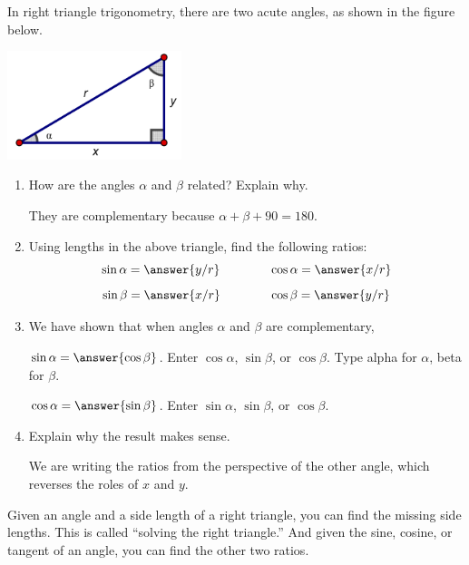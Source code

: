 \documentclass[nooutcomes]{ximera}
\begin{document}
\begin{problem}
In right triangle trigonometry, there are two acute angles, as shown in the figure below.
\begin{image}
\includegraphics[width=2in]{rightTriangle2.png}
\end{image}
\begin{enumerate}
\item How are the angles $\alpha$ and $\beta$ related?  Explain why.  \begin{hint}They are complementary because $\alpha+\beta+90=180$.\end{hint}
\item Using lengths in the above triangle, find the following ratios:    
\[
\sin\alpha = \answer{y/r} \qquad\qquad \cos\alpha = \answer{x/r}
\]
\[
\sin\beta = \answer{x/r} \qquad\qquad \cos\beta = \answer{y/r}
\]
\item We have shown that when angles $\alpha$ and $\beta$ are complementary, 

$\sin\alpha=\answer{\cos\beta}$.  \qquad Enter $\cos\alpha$, $\sin\beta$, or $\cos\beta$.  Type alpha for $\alpha$, beta for $\beta$.  

$\cos\alpha =\answer{\sin\beta}$.  \qquad Enter $\sin\alpha$, $\sin\beta$, or $\cos\beta$.  

\item Explain why the result makes sense.  \begin{hint}We are writing the ratios from the perspective of the other angle, which reverses 
the roles of $x$ and $y$.\end{hint}
\end{enumerate}
\end{problem}

Given an angle and a side length of a right triangle, you can find the missing side lengths.  This is called ``solving the right triangle.''    
And given the sine, cosine, or tangent of an angle, you can find the other two ratios. 
\end{document}
